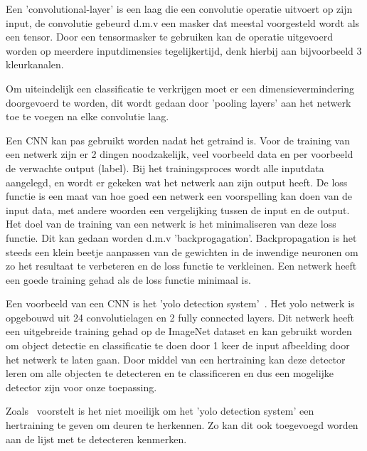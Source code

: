            Een 'convolutional-layer' is een laag die een convolutie operatie uitvoert op zijn input, de convolutie gebeurd d.m.v een masker dat meestal voorgesteld wordt als een tensor.
            Door een tensormasker te gebruiken kan de operatie uitgevoerd worden op meerdere inputdimensies tegelijkertijd, denk hierbij aan bijvoorbeeld 3 kleurkanalen.

            Om uiteindelijk een classificatie te verkrijgen moet er een dimensievermindering doorgevoerd te worden, dit wordt gedaan door 'pooling layers' aan het netwerk toe te voegen na elke convolutie laag. 

            Een CNN kan pas gebruikt worden nadat het getraind is. Voor de training van een netwerk zijn er 2 dingen noodzakelijk, veel voorbeeld data en per voorbeeld de verwachte output (label).
            Bij het trainingsproces wordt alle inputdata aangelegd, en wordt er gekeken wat het netwerk aan zijn output heeft.
            De loss functie is een maat van hoe goed een netwerk een voorspelling kan doen van de input data, met andere woorden een vergelijking tussen de input en de output. Het doel van de training van een netwerk is het minimaliseren
            van deze loss functie. Dit kan gedaan worden d.m.v 'backprogagation'. Backpropagation is het steeds een klein beetje aanpassen van de gewichten in de inwendige neuronen om zo het resultaat te verbeteren en de loss functie te verkleinen.
            Een netwerk heeft een goede training gehad als de loss functie minimaal is.

            Een voorbeeld van een CNN is het '\gls{yolo} detection system'~\cite{Redmon_2016}. Het \gls{yolo} netwerk is opgebouwd uit 24 convolutielagen en 2 fully connected layers.
            Dit netwerk heeft een uitgebreide training gehad op de ImageNet dataset en kan gebruikt worden om object detectie en classificatie te doen door 1 keer de input afbeelding door het netwerk te laten gaan.
            Door middel van een hertraining kan deze detector leren om alle objecten te detecteren en te classificeren en dus een mogelijke detector zijn voor onze toepassing.

            Zoals~\cite{Llopart2017} voorstelt is het niet moeilijk om het '\gls{yolo} detection system' een hertraining te geven om deuren te herkennen. Zo kan dit ook toegevoegd worden aan de lijst met te detecteren kenmerken. 


